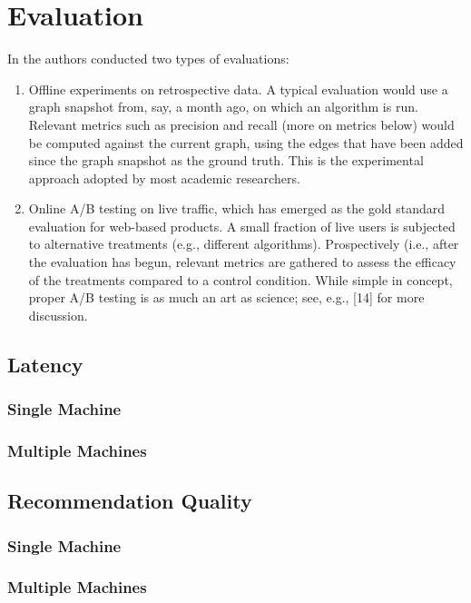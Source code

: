 \section{Evaluation}
\label{evaluation}
In \cite{gupta2013wtf} the authors conducted two types of evaluations:

\begin{enumerate}
	\item Offline experiments on retrospective data. A typical evaluation would use a graph snapshot from, say, a month ago, on which an algorithm is run. Relevant metrics such as precision and recall (more on metrics below) would be computed against the current graph, using the edges that have been added since the graph snapshot as the ground truth. This is the experimental approach adopted by most academic researchers.
	\item Online A/B testing on live traffic, which has emerged as the gold standard evaluation for web-based products. A small fraction of live users is subjected to alternative treatments (e.g., different algorithms). Prospectively (i.e., after the evaluation has begun, relevant metrics are gathered to assess the efficacy of the treatments compared to a control condition. While simple in concept, proper A/B testing is as much an art as science; see, e.g., [14] for more discussion.
\end{enumerate}


\subsection{Latency}
\subsubsection{Single Machine}
\label{Riado_Lyaer_RL}


\subsubsection{Multiple Machines}
\label{Riado_Lyaer_RL}


\subsection{Recommendation Quality}
\subsubsection{Single Machine}
\label{Riado_Lyaer_RL}


\subsubsection{Multiple Machines}
\label{Riado_Lyaer_RL}

